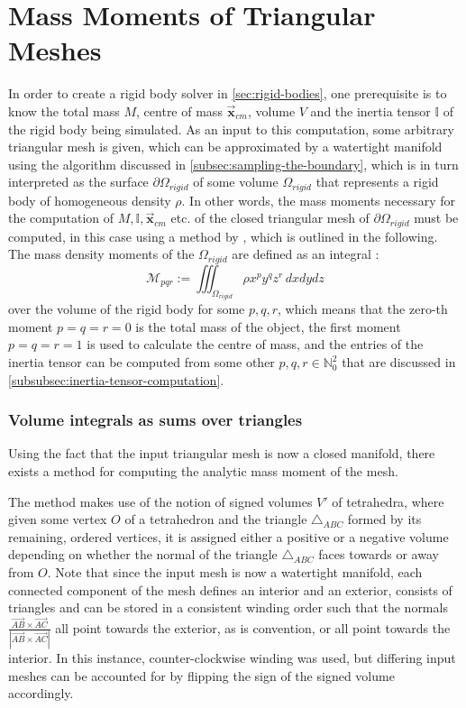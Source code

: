 \documentclass[oneside, a4paper]{book}
\newcommand\abs[1]{\left|#1\right|}
\newcommand\vek[1]{\vec{\bm{#1}}}
\begin{document}
    \section{Mass Moments of Triangular Meshes}\label{sec:mass-moments}
    In order to create a rigid body solver in \autoref{sec:rigid-bodies}, one prerequisite is to know the total mass $M$, centre of mass $\vek{x}_{cm}$, volume $V$ and the inertia tensor $\mathds{I}$ of the rigid body being simulated. As an input to this computation, some arbitrary triangular mesh is given, which can be approximated by a watertight manifold using the algorithm discussed in \autoref{subsec:sampling-the-boundary}, which is in turn interpreted as the surface $\partial\Omega_{rigid}$ of some volume $\Omega_{rigid}$ that represents a rigid body of homogeneous density $\rho$. In other words, the mass moments necessary for the computation of $M,\mathds{I},\vek{x}_{cm}$ etc. of the closed triangular mesh of $\partial\Omega_{rigid}$ must be computed, in this case using a method by \autocite[Zhang and Chen]{efficient-feature-extraction}, which is outlined in the following. The mass density moments of the $\Omega_{rigid}$ are defined as an integral \autocite{efficient-feature-extraction}:
    \begin{equation}\label{eq:mass-density-moments}
      \mathcal{M}_{pqr} := \iiint_{\Omega_{rigid}} \rho x^p y^q z^r  \, dxdydz
    \end{equation}
    over the volume of the rigid body for some $p,q,r$, which means that the zero-th moment $p=q=r=0$ is the total mass of the object, the first moment $p=q=r=1$ is used to calculate the centre of mass, and the entries of the inertia tensor can be computed from some other $p,q,r \in \mathds{N}_0^2$ that are discussed in \autoref{subsubsec:inertia-tensor-computation}.

    \subsubsection{Volume integrals as sums over triangles}
    
    Using the fact that the input triangular mesh is now a closed manifold, there exists a method for computing the analytic mass moment of the mesh. 
    
    The method makes use of the notion of signed volumes $V'$ of tetrahedra, where given some vertex $O$ of a tetrahedron and the triangle $\triangle_{ABC}$ formed by its remaining, ordered vertices, it is assigned either a positive or a negative volume depending on whether the normal of the triangle $\triangle_{ABC}$ faces towards or away from $O$. Note that since the input mesh is now a watertight manifold, each connected component of the mesh defines an interior and an exterior, consists of triangles and can be stored in a consistent winding order such that the normals $\frac{\overrightarrow{AB} \times \overrightarrow{AC}}{\abs{\overrightarrow{AB} \times \overrightarrow{AC}}}$ all point towards the exterior, as is convention, or all point towards the interior. In this instance, counter-clockwise winding was used, but differing input meshes can be accounted for by flipping the sign of the signed volume accordingly.
    
\end{document}
